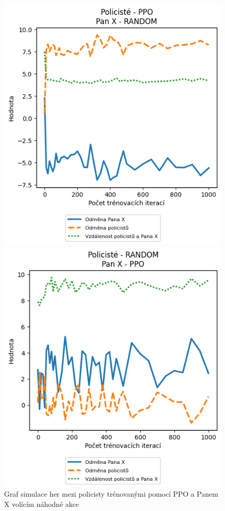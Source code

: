 \begin{figure}[H]
  \begin{minipage}{.48\textwidth}
    \centering
    \includegraphics[width=1\textwidth]{obrazky-figures/graphs/cop_PPO_mrx_RANDOM}
    \caption{Graf simulace her mezi policisty trénovanými pomocí PPO a Panem X volícím náhodné akce}
    \label{fig:cop_ppo_mrx_random}
  \end{minipage}\hfill
  \begin{minipage}{.48\textwidth}
    \centering
    \includegraphics[width=1\textwidth]{obrazky-figures/graphs/cop_RANDOM_mrx_PPO}

\end{minipage}
\end{figure}
